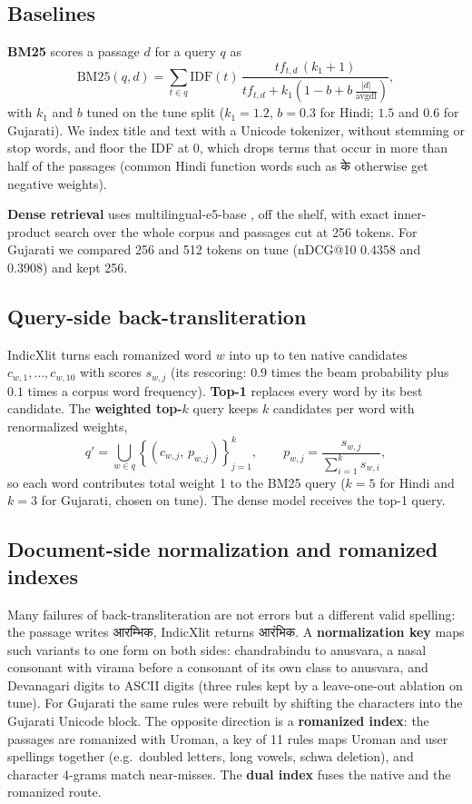 \documentclass[11pt,a4paper]{article}
\newcommand{\dev}[1]{{\devfont #1}}
\begin{document}
\subsection{Baselines}
\textbf{BM25} scores a passage $d$ for a query $q$ as
\begin{equation}
  \mathrm{BM25}(q,d) = \sum_{t \in q} \mathrm{IDF}(t)\,
  \frac{tf_{t,d}\,(k_1+1)}{tf_{t,d} + k_1\left(1 - b + b\,\frac{|d|}{\mathrm{avgdl}}\right)},
\end{equation}
with $k_1$ and $b$ tuned on the tune split ($k_1 = 1.2$, $b = 0.3$ for Hindi; $1.5$ and $0.6$
for Gujarati). We index title and text with a Unicode tokenizer, without stemming or stop
words, and floor the IDF at 0, which drops terms that occur in more than half of the passages
(common Hindi function words such as \dev{के} otherwise get negative weights).

\textbf{Dense retrieval} uses multilingual-e5-base \citep{wang2024me5}, off the shelf, with
exact inner-product search over the whole corpus and passages cut at 256 tokens. For Gujarati
we compared 256 and 512 tokens on tune (nDCG@10 0.4358 and 0.3908) and kept 256.

\subsection{Query-side back-transliteration}
IndicXlit \citep{madhani2023aksharantar} turns each romanized word $w$ into up to ten native
candidates $c_{w,1},\dots,c_{w,10}$ with scores $s_{w,j}$ (its rescoring:
$0.9$ times the beam probability plus $0.1$ times a corpus word frequency). \textbf{Top-1}
replaces every word by its best candidate. The \textbf{weighted top-$k$} query keeps $k$
candidates per word with renormalized weights,
\begin{equation}
  q' = \bigcup_{w \in q} \left\{\left(c_{w,j},\, p_{w,j}\right)\right\}_{j=1}^{k},
  \qquad p_{w,j} = \frac{s_{w,j}}{\sum_{i=1}^{k} s_{w,i}},
\end{equation}
so each word contributes total weight 1 to the BM25 query ($k = 5$ for Hindi and $k = 3$ for
Gujarati, chosen on tune). The dense model receives the top-1 query.

\subsection{Document-side normalization and romanized indexes}
Many failures of back-transliteration are not errors but a different valid spelling: the
passage writes \dev{आरम्भिक}, IndicXlit returns \dev{आरंभिक}. A \textbf{normalization key}
maps such variants to one form on both sides: chandrabindu to anusvara, a nasal consonant
with virama before a consonant of its own class to anusvara, and Devanagari digits to ASCII
digits (three rules kept by a leave-one-out ablation on tune). For Gujarati the same rules
were rebuilt by shifting the characters into the Gujarati Unicode block. The opposite
direction is a \textbf{romanized index}: the passages are romanized with Uroman, a key of 11
rules maps Uroman and user spellings together (e.g.\ doubled letters, long vowels, schwa
deletion), and character 4-grams match near-misses. The \textbf{dual index} fuses the
native and the romanized route.
\end{document}
